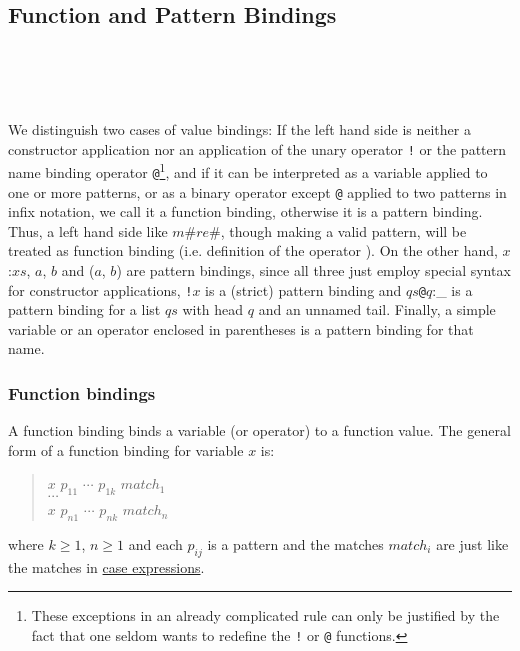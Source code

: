 \subsection{Function and Pattern Bindings} \label{binding}

\begin{flushleft}
  \\
  \oder{} \\
  
  \alt {}  \\
 \sym{=}  
  \alt {}   
\end{flushleft}

We distinguish two cases of value bindings: If the left hand side is neither a constructor application nor an application of the unary operator \texttt{!} or the pattern name binding operator \texttt{@}\footnote{These exceptions in an already complicated rule can only be justified by the fact that one seldom wants to redefine the \texttt{!} or \texttt{@} functions.}, and if it can be interpreted as a variable applied to one or more patterns, or as a binary operator except \texttt{@} applied to two patterns in infix notation, we call it a function binding, otherwise it is a pattern binding. Thus, a left hand side like $m$\#$re$\#, though making a valid pattern, will be treated as function binding (i.e. definition of the operator  \texttt{}). On the other hand, $x$:$xs$, \bracka{}$a$, $b$\brackz{} and ($a$, $b$) are pattern bindings, since all three just employ special syntax for constructor applications, \texttt{!}$x$ is a (strict) pattern binding and $qs$\texttt{@}$q$:\_ is a pattern binding for a list $qs$ with head $q$ and an unnamed tail. Finally, a simple variable or an operator enclosed in parentheses is a pattern binding for that name.

\subsubsection{Function bindings} \label{fundef}

A function binding binds a variable (or operator) to a function value.
The general form of a function binding for variable $x$ is:
\begin{quote}
\begin{flushleft}
$x$ $p_{11}$ $\cdots$ $p_{1k}$ $match_1$\\
$\cdots$\\
$x$ $p_{n1}$ $\cdots$ $p_{nk}$ $match_n$\\
\end{flushleft}
\end{quote}
where $k\ge 1$, $n\ge 1$ and each $p_{ij}$ is a pattern and the matches $match_i$ are just like the matches in \hyperref[caseex]{case expressions}.


